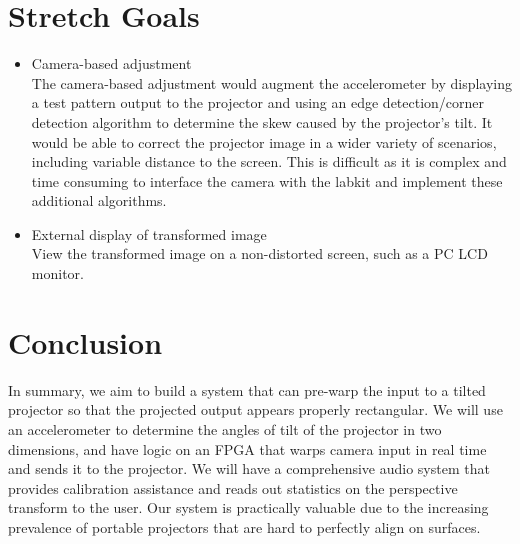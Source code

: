 \documentclass{article}
\begin{document}
\section{Stretch Goals}
	\begin{itemize}
		\item Camera-based adjustment \hfill \\
			The camera-based adjustment would augment the accelerometer by displaying a test pattern output to the projector and using an edge detection/corner detection algorithm to determine the skew caused by the projector's tilt. It would be able to correct the projector image in a wider variety of scenarios, including variable distance to the screen. This is difficult as it is complex and time consuming to interface the camera with the labkit and implement these additional algorithms.
		\item External display of transformed image\hfill \\
			View the transformed image on a non-distorted screen, such as a PC LCD monitor.
	\end{itemize}

\section{Conclusion}
In summary, we aim to build a system that can pre-warp the input to a tilted projector so that the projected output appears properly rectangular. We will use an accelerometer to determine the angles of tilt of the projector in two dimensions, and have logic on an FPGA that warps camera input in real time and sends it to the projector. We will have a comprehensive audio system that provides calibration assistance and reads out statistics on the perspective transform to the user. Our system is practically valuable due to the increasing prevalence of portable projectors that are hard to perfectly align on surfaces.
\end{document}
